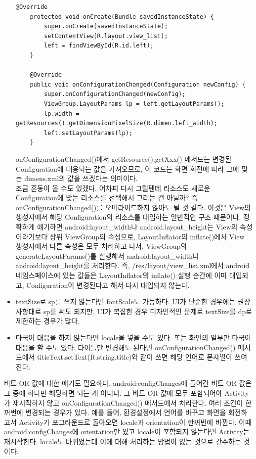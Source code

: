 \begin{itemize}
\begin{lstlisting}[frame=single]
	@Override
	protected void onCreate(Bundle savedInstanceState) {
		super.onCreate(savedInstanceState);
		setContentView(R.layout.view_list);
		left = findViewById(R.id.left);
	}

	@Override
	public void onConfigurationChanged(Configuration newConfig) {
		super.onConfigurationChanged(newConfig);
		ViewGroup.LayoutParams lp = left.getLayoutParams();
		lp.width = getResources().getDimensionPixelSize(R.dimen.left_width);
		left.setLayoutParams(lp);
	}
\end{lstlisting}
onConfigurationChanged()에서 getResource().getXxx() 메서드는 변경된 Configuration에 대응되는 값을 가져오므로, 이 코드는 화면 회전에 따라 그에 맞는 dimens.xml의 값을 쓰겠다는 의미이다.\\

조금 혼동이 올 수도 있겠다. 어차피 다시 그릴텐데 리소스도 새로운 Configuration에 맞는 리소스를 선택해서 그리는 건 아닐까? 
즉 onConfigurationChanged()를 오버라이드하지 않아도 될 것 같다.
이것은 View의 생성자에서 해당 Configuration의 리소스를 대입하는 일반적인 구조 때문이다. 정확하게 얘기하면 android:layout\_width나 android:layout\_height는 View의 속성이라기보다 상위 ViewGroup의 속성으로, LayoutInflator의 inflate()에서 View 생성자에서 다른 속성은 모두 처리하고 나서, ViewGroup의 generateLayoutParams()를 실행해서 android:layout\_width나 android:layout\_height를 처리한다.
즉, /res/layout/view\_list.xml에서 android 네임스페이스에 있는 값들은 LayoutInflator의 inflate() 실행 순간에 이미 대입되고, Configuration이 변경된다고 해서 다시 대입되지 않는다. 
	
\item textSize로 sp를 쓰지 않는다면 fontScale도 가능하다. UI가 단순한 경우에는 권장사항대로 sp를 써도 되지만, UI가 복잡한 경우 디자인적인 문제로 textSize를 dp로 제한하는 경우가 많다.

\item 다국어 대응을 하지 않는다면 locale을 넣을 수도 있다. 또는 화면의 일부만 다국어 대응을 할 수도 있다. 타이틀만 변경해도 된다면 onConfigurationChanged() 메서드에서 titleText.setText(R.string.title)와 같이 쓰면 해당 언어로 문자열이 쓰여진다.
\end{itemize}

비트 OR 값에 대한 얘기도 필요하다. android:configChanges에 들어간 비트 OR 값은 그 중에 하나만 해당하면 되는 게 아니다. 그 비트 OR 값에 모두 포함되어야 Activity가 재시작하지 않고 onConfigurationChanged() 메서드에서 처리한다. 여러 조건이 한꺼번에 변경되는 경우가 있다. 예를 들어, 환경설정에서 언어를 바꾸고 화면을 회전하고서 Activity가 포그라운드로 돌아오면 locale과 orientation이 한꺼번에 바뀐다. 이때 android:configChanges에 orientation만 있고 locale이 포함되지 않는다면 Activity는 재시작한다. locale도 바뀌었는데 이에 대해 처리하는 방법이 없는 것으로 간주하는 것이다.\\

